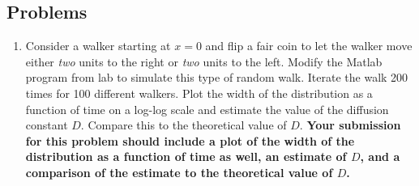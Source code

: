 \documentclass[12pt]{article}
\begin{document}
\subsection*{Problems}
\begin{enumerate}
\item Consider a walker starting at $x = 0$ and flip a fair coin to let the walker move either \textit{two} units to the right or \textit{two} units to the left.  Modify the Matlab program from lab to simulate this type of random walk.  Iterate the walk 200 times for 100 different walkers.  Plot the width of the distribution as a function of time on a log-log scale and estimate the value of the diffusion constant $D$.  Compare this to the theoretical value of $D$.  \textbf{Your submission for this problem should include a plot of the width of the distribution as a function of time as well, an estimate of $D$, and a comparison of the estimate to the theoretical value of $D$.}


\end{enumerate}
\end{document}
